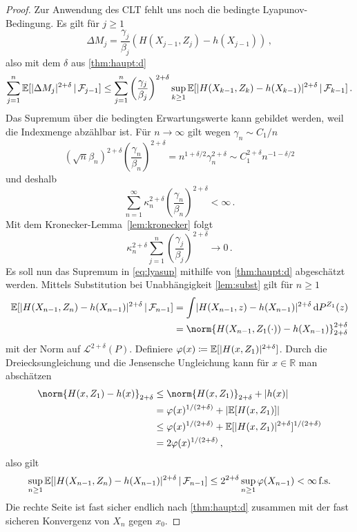 \documentclass[ngerman,a4paper,11pt]{scrartcl}
\newcommand{\EE}{\mathbb{E}}
\newcommand{\RR}{\mathbb{R}}
\newcommand{\ff}{\mathcal{F}}
\renewcommand{\ll}{\mathcal{L}}
\newcommand{\interv}{\RR}
\newcommand{\expect}[1]{\EE[#1]}
\newcommand{\condexp}[2]{\EE[#1\,|\,#2]}
\newcommand{\dvar}[1]{\,\mathrm{d}#1}
\DeclarePairedDelimiter{\abs}{\lvert}{\rvert}		%
\begin{document}
\begin{proof}
Zur Anwendung des CLT fehlt uns noch die bedingte Lyapunov-Bedingung. Es gilt
für $j\geq 1$
\begin{equation*}
 \Delta M_j=\frac{\gamma_j}{\beta_j}(H(X_{j-1},Z_j)-h(X_{j-1}))\,,
\end{equation*}
also mit dem $\delta$ aus \cref{thm:haupt:d}
\begin{equation}\label{eq:lyasup}
 \sum_{j=1}^n\condexp{\abs{\Delta M_j}^{2+\delta}}{\ff_{j-1}}\leq\sum_{j=1}^n\left( \frac{\gamma_j}{\beta_j} \right)^{2+\delta}\sup_{k\geq 1}\condexp{\abs{H(X_{k-1}, Z_k)-h(X_{k-1})}^{2+\delta}}{\ff_{k-1}}\,.
\end{equation}
Das Supremum über die bedingten Erwartungswerte kann gebildet werden, weil die
Indexmenge abzählbar ist. Für $n\to\infty$ gilt wegen $\gamma_n\sim C_1/n$
\begin{equation*}
 (\sqrt{n}\beta_n)^{2+\delta} \left( \frac{\gamma_n}{\beta_n} \right)^{2+\delta}=n^{1+\delta/2}\gamma_n^{2+\delta}\sim C_1^{2+\delta}n^{-1-\delta/2}
\end{equation*}
und deshalb
\begin{equation*}
 \sum_{n=1}^\infty \kappa_n^{2+\delta}\left( \frac{\gamma_n}{\beta_n} \right)^{2+\delta}<\infty\,.
\end{equation*}
Mit dem Kronecker-Lemma~\ref{lem:kronecker} folgt
\begin{equation*}
 \kappa_n^{2+\delta} \sum_{j=1}^n\left( \frac{\gamma_j}{\beta_j} \right)^{2+\delta}\to 0\,.
\end{equation*}
Es soll nun das Supremum in \cref{eq:lyasup} mithilfe von \cref{thm:haupt:d} abgeschätzt werden.
Mittels Substitution bei Unabhängigkeit \ref{lem:subst} gilt für $n\geq 1$
\begin{align*}
  \condexp{\abs{H(X_{n-1},Z_n)-h(X_{n-1})}^{2+\delta}}{\ff_{n-1}}&=\int\abs{H(X_{n-1},z)-h(X_{n-1})}^{2+\delta}\dvar{P^{Z_1}(z)} \\
&=\norm{H(X_{n-1},Z_1(\cdot))-h(X_{n-1})}_{2+\delta}^{2+\delta}
\end{align*}
mit der Norm auf $\ll^{2+\delta}(P)$. Definiere
$\varphi(x)\coloneqq\expect{\abs{H(x,Z_1)}^{2+\delta}}$. Durch die
Dreiecksungleichung und die Jensensche Ungleichung kann für $x\in \interv$ man abschätzen
 \begin{align*}
   \norm{H(x,Z_1)-h(x)}_{2+\delta}&\leq\norm{H(x,Z_1)}_{2+\delta}+\abs{h(x)}\\
    &=\varphi(x)^{1/(2+\delta)}+\abs{\expect{H(x, Z_1)}}\\
&\leq\varphi(x)^{1/(2+\delta)}+\expect{\abs{H(x, Z_1)}^{2+\delta}}^{1/(2+\delta)}\\
&=2\varphi(x)^{1/(2+\delta)}\,,
 \end{align*}
 also gilt
 \begin{equation*}
  \sup_{n\geq 1} \condexp{\abs{H(X_{n-1},Z_n)-h(X_{n-1})}^{2+\delta}}{\ff_{n-1}}\leq 2^{2+\delta}\sup_{n\geq 1}\varphi(X_{n-1})<\infty\,\text{f.s.}
 \end{equation*}
 Die rechte Seite ist fast sicher endlich nach \cref{thm:haupt:d} zusammen mit der fast sicheren Konvergenz von $X_n$
 gegen $x_0$.
 

\end{proof}
\end{document}
